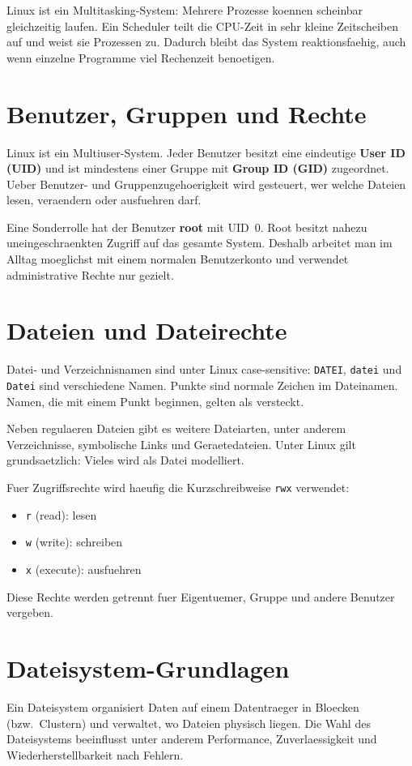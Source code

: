 \documentclass[11pt, oneside, numbers=noenddot]{scrbook}
\begin{document}
Linux ist ein Multitasking-System: Mehrere Prozesse koennen scheinbar gleichzeitig laufen. Ein Scheduler teilt die CPU-Zeit in sehr kleine Zeitscheiben auf und weist sie Prozessen zu. Dadurch bleibt das System reaktionsfaehig, auch wenn einzelne Programme viel Rechenzeit benoetigen.

\section{Benutzer, Gruppen und Rechte}
Linux ist ein Multiuser-System. Jeder Benutzer besitzt eine eindeutige \textbf{User ID (UID)} und ist mindestens einer Gruppe mit \textbf{Group ID (GID)} zugeordnet. Ueber Benutzer- und Gruppenzugehoerigkeit wird gesteuert, wer welche Dateien lesen, veraendern oder ausfuehren darf.

Eine Sonderrolle hat der Benutzer \textbf{root} mit UID~0. Root besitzt nahezu uneingeschraenkten Zugriff auf das gesamte System. Deshalb arbeitet man im Alltag moeglichst mit einem normalen Benutzerkonto und verwendet administrative Rechte nur gezielt.

\section{Dateien und Dateirechte}
Datei- und Verzeichnisnamen sind unter Linux case-sensitive: \texttt{DATEI}, \texttt{datei} und \texttt{Datei} sind verschiedene Namen. Punkte sind normale Zeichen im Dateinamen. Namen, die mit einem Punkt beginnen, gelten als versteckt.

Neben regulaeren Dateien gibt es weitere Dateiarten, unter anderem Verzeichnisse, symbolische Links und Geraetedateien. Unter Linux gilt grundsaetzlich: Vieles wird als Datei modelliert.

Fuer Zugriffsrechte wird haeufig die Kurzschreibweise \texttt{rwx} verwendet:
\begin{itemize}
\item \texttt{r} (read): lesen
\item \texttt{w} (write): schreiben
\item \texttt{x} (execute): ausfuehren
\end{itemize}
Diese Rechte werden getrennt fuer Eigentuemer, Gruppe und andere Benutzer vergeben.

\section{Dateisystem-Grundlagen}
Ein Dateisystem organisiert Daten auf einem Datentraeger in Bloecken (bzw.\ Clustern) und verwaltet, wo Dateien physisch liegen. Die Wahl des Dateisystems beeinflusst unter anderem Performance, Zuverlaessigkeit und Wiederherstellbarkeit nach Fehlern.
\end{document}
